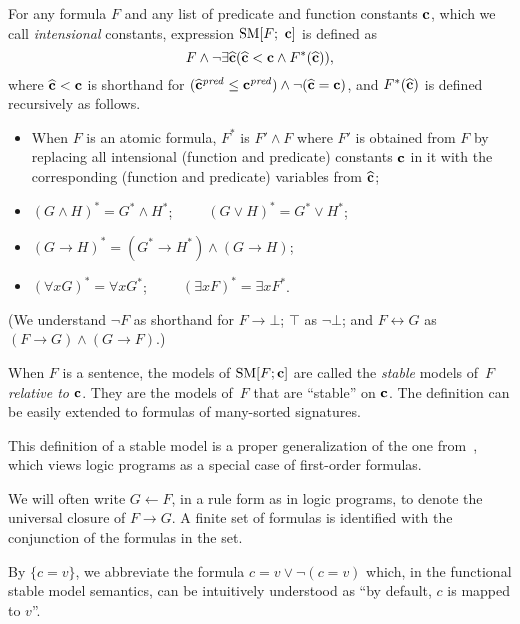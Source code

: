 \documentclass[runningheads]{llncs}
\def\ar{\leftarrow}
\def\ar{\leftarrow}
\def\rar{\rightarrow}
\def\lrar{\leftrightarrow}
\def\fsm{\hbox{\rm SM}}
\def\mi#1{\mathit{#1}}
\def\bC{{\bf{c}}}
\def\vbC{{\wh{\bf{c}}}}
\def\v{\hbox{$\upsilon$}}
\def\wh{\widehat}
\def\mvis{\!=\!}
\begin{document}
For any formula $F$ and any list of predicate and function constants $\bC$, which we call {\sl intensional} constants, expression $\fsm[F;\ \bC]$ is defined as
\[
   F\land\neg\exists \vbC(\vbC<\bC\land F^*(\vbC)),
\]
where $\vbC<\bC$ is shorthand for 
$(\vbC^\mi{pred}\le \bC^\mi{pred})\land\neg (\vbC=\bC)$, 
and $F^*(\vbC)$ is defined recursively as follows.
\begin{itemize}%
\item When $F$ is an atomic formula, $F^*$ is $F'\land F$ where $F'$
  is obtained from $F$ by replacing all intensional (function and
  predicate) constants ${\bf c}$ in it with the corresponding
  (function and predicate) variables from ${\vbC}$;


\item  $(G\land H)^* = G^*\land H^*$;\ \ \ \ \
       $(G\lor H)^* = G^*\lor H^*$;

\item  $(G\rar H)^* = (G^*\rar H^*)\land (G\rar H)$;

\item  $(\forall x G)^* = \forall x G^*$;\ \ \ \ \
       $(\exists xF)^* = \exists x F^*$.
\end{itemize}
(We understand $\neg F$ as shorthand for $F\rar\bot$; $\top$ as
$\neg \bot$; and $F\lrar G$ as $(F\rar G)\land (G\rar F)$.)

When $F$ is a sentence, the models of $\fsm[F; {\bf c}]$ are called
the {\em stable} models of~$F$ {\em  relative to} ${\bf c}$. They are
the models of~$F$ that are ``stable'' on ${\bf c}$.
The definition can be easily extended to formulas of many-sorted
signatures.

This definition of a stable model is a proper generalization of the
one from~\cite{ferraris11stable}, which views logic programs as a
special case of first-order formulas. 

We will often write $G\ar F$, in a rule form as in logic programs, 
to denote the universal closure of $F\rar G$. 
A finite set of formulas is identified with the conjunction of the
formulas in the set.

By $\{c\mvis v\}$, we abbreviate the formula $c\mvis v\lor \neg (c\mvis v)$
which, in the functional stable model semantics, can be intuitively
understood as ``by default, $c$ is mapped to $v$''. 
\end{document}

